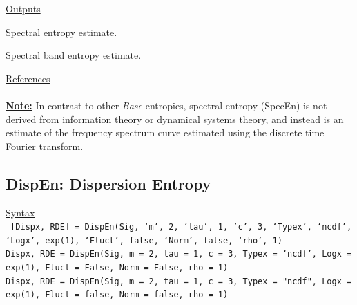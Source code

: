 \documentclass[12pt, a4paper, titlepage, openany]{book}
\begin{document}
\noindent \ul{Outputs}
\begin{description}[labelsep=1cm, labelwidth=2cm, nosep, style=multiline,leftmargin=3cm]\footnotesize
\item[\texttt{Spec}]		Spectral entropy estimate.
\item[\texttt{BandEn}]		Spectral band entropy estimate.
\end{description}

\noindent \ul{References}\hspace{1cm}
\cite{Spec1} \cite{Spec2}
\\ \ \\
\noindent\ul{\textbf{Note:}}\hspace{5mm} In contrast to other \textit{Base} entropies, spectral entropy (SpecEn) is not derived from information theory or dynamical systems theory, and instead is an estimate of the frequency spectrum curve estimated using the discrete time Fourier transform.



\newpage
\subsection{\normalsize DispEn: \hspace{15mm} Dispersion Entropy}
\noindent\ul{Syntax} \vspace{6mm} \\ \noindent \texttt{\footnotesize
[Dispx, RDE] = DispEn(Sig, ‘m’, 2, ‘tau’, 1, 'c', 3, ‘Typex’, ‘ncdf’, ‘Logx’, exp(1), ‘Fluct’, false, ‘Norm’, false, ‘rho’, 1)\\
 Dispx, RDE  = DispEn(Sig, m = 2, tau = 1, c = 3, Typex = ‘ncdf’, Logx = exp(1), Fluct = False, Norm = False, rho = 1) \\
 Dispx, RDE  = DispEn(Sig, m = 2, tau = 1, c = 3, Typex = "ncdf", Logx = exp(1), Fluct = false, Norm = false, rho = 1)}
\end{document}
